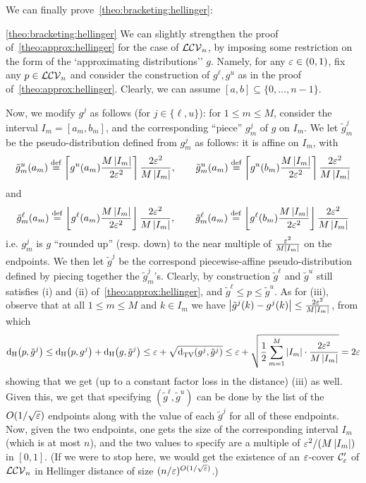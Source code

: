 \noindent We can finally prove~\cref{theo:bracketing:hellinger}:
\begin{proofof}{\cref{theo:bracketing:hellinger}}
We can slightly strengthen the proof of~\cref{theo:approx:hellinger} for the case of $\classlogconcave[n]$, by imposing some restriction on the form of the `approximating distributions'' $g$. Namely, for any $\eps\in(0,1)$, fix any $p\in\classlogconcave[n]$ and consider the construction of $g^\ell,g^u$ as in the proof of~\cref{theo:approx:hellinger}. Clearly, we can assume $[a,b]\subseteq\{0,\dots,n-1\}$. 

Now, we modify $g^j$ as follows (for $j\in\{\ell,u\}$): for $1\leq m\leq M$, consider the interval $I_m=[a_m,b_m]$, and the corresponding ``piece'' $g^j_m$ of $g$ on $I_m$. We let $\tilde{g}^j_m$ be the pseudo-distribution defined from $g^j_m$ as follows: it is affine on $I_m$, with
\[
\tilde{g}^u_m(a_m) \eqdef \clg{g^u(a_m)\frac{M\abs{I_m}}{2\eps^2}}\frac{2\eps^2}{M\abs{I_m}}, \qquad \tilde{g}^u_m(a_m) \eqdef \clg{g^u(b_m)\frac{M\abs{I_m}}{2\eps^2}}\frac{2\eps^2}{M\abs{I_m}}
\]
and
\[
\tilde{g}^\ell_m(a_m) \eqdef \flr{g^\ell(a_m)\frac{M\abs{I_m}}{2\eps^2}}\frac{2\eps^2}{M\abs{I_m}}, \qquad \tilde{g}^\ell_m(a_m) \eqdef \flr{g^\ell(b_m)\frac{M\abs{I_m}}{2\eps^2}}\frac{2\eps^2}{M\abs{I_m}}
\]
i.e. $g^j_m$ is $g$ ``rounded up'' (resp. down) to the near multiple of $\frac{\eps^2}{M\abs{I_m}}$ on the endpoints. We then let $\tilde{g}^j$ be the correspond piecewise-affine pseudo-distribution defined by piecing together the $\tilde{g}^j_m$'s. Clearly, by construction $\tilde{g}^\ell$ and $\tilde{g}^u$ still satisfies (i) and (ii) of~\cref{theo:approx:hellinger}, and $\tilde{g}^\ell\leq p\leq\tilde{g}^u$. As for (iii), observe that at all $1\leq m\leq M$ and $k\in I_m$ we have $\abs{\tilde{g}^j(k)-g^j(k)} \leq \frac{2\eps^2}{M\abs{I_m}}$, from which
\[
  \hellinger{p}{\tilde{g}^j} \leq \hellinger{p}{g^j} + \hellinger{g}{\tilde{g}^j}
  \leq \eps + \sqrt{\totalvardist{g^j}{\tilde{g}^j}}
  \leq \eps + \sqrt{\frac{1}{2}\sum_{m=1}^M \abs{I_m}\cdot\frac{2\eps^2}{M\abs{I_m}}}
  = 2\eps
\]
showing that we get (up to a constant factor loss in the distance) (iii) as well. Given this, we get that specifying $(\tilde{g}^\ell,\tilde{g}^u)$ can be done by the list of the $O(1/\sqrt{\eps})$ endpoints along with the value of each $\tilde{g}^j$ for all of these endpoints. Now, given the two endpoints, one gets the size of the corresponding interval $I_m$ (which is at most $n$), and the two values to specify are a multiple of $\eps^2/(M\abs{I_m})$ in $[0,1]$. (If we were to stop here, we would get the existence of an $\eps$-cover $\class'_\eps$ of $\classlogconcave[n]$ in Hellinger distance of size $(n/\eps)^{O(1/\sqrt{\eps})}$.)



\end{proofof}
